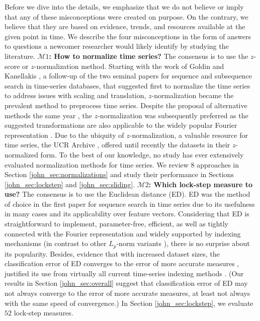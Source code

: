 \documentclass[11pt]{article}
\begin{document}
Before we dive into the details, we emphasize that we do not believe or imply that any of these misconceptions were created on purpose. On the contrary, we believe that they are based on evidence, trends, and resources available at the given point in time. We describe the four misconceptions in the form of answers to questions a newcomer researcher would likely identify by studying the literature.
\newline \textbf{$\mathcal{M}1$: How to normalize time series?} The consensus is to use the $z$-score or $z$-normalization method. Starting with the work of Goldin and Kanellakis \cite{goldin1995similarity}, a follow-up of the two seminal papers for sequence \cite{agrawal1993} and subsequence \cite{Faloutsos1994fast} search in time-series databases, that suggested first to normalize the time series to address issues with scaling and translation, $z$-normalization became the prevalent method to preprocess time series. Despite the proposal of alternative methods the same year \cite{lin1995fast}, the $z$-normalization was subsequently preferred as the suggested transformations are also applicable to the widely popular Fourier representation \cite{agrawal1993,Faloutsos1994fast,rafiei1997similarity}. Due to the ubiquity of $z$-normalization, a valuable resource for time series, the UCR Archive \cite{UCRArchive2018}, offered until recently the datasets in their $z$-normalized form. To the best of our knowledge, no study has ever extensively evaluated normalization methods for time series. We review $8$ approaches in Section \ref{john_sec:normalizations} and study their performance in Sections \ref{john_sec:lockstep} and \ref{john_sec:sliding}.
\newline \textbf{$\mathcal{M}2$: Which lock-step measure to use?} The consensus is to use the Euclidean distance (ED). ED was the method of choice in the first paper for sequence search in time series \cite{agrawal1993} due to its usefulness in many cases and its applicability over feature vectors. Considering that ED is straightforward to implement, parameter-free, efficient, as well as tightly connected with the Fourier representation and widely supported by indexing mechanisms (in contrast to other $L_p$-norm variants \cite{yi2000fast}), there is no surprise about its popularity. Besides, evidence that with increased dataset sizes, the classification error of ED converges to the error of more accurate measures \cite{shieh2008sax}, justified its use from virtually all current time-series indexing methods \cite{echihabi2018lernaean}. (Our results in Section \ref{john_sec:overall} suggest that classification error of ED may not always converge to the error of more accurate measures, at least not always with the same speed of convergence.) In Section \ref{john_sec:lockstep}, we evaluate $52$ lock-step measures.
\end{document}
